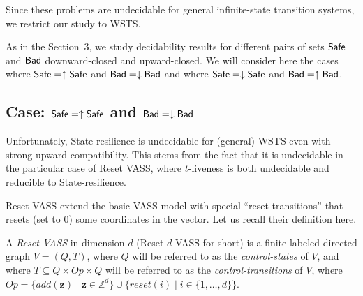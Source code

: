 


Since these problems are undecidable for general infinite-state transition systems, we restrict our study to WSTS.

As in the Section~3, we study decidability results for different pairs of sets $\textsf{Safe}$ and $\textsf{Bad}$ downward-closed and upward-closed. We will consider here the cases where 
$\textsf{Safe} = \uparrow \textsf{Safe}$ and $\textsf{Bad} = \downarrow \textsf{Bad}$ 
and where 
$\textsf{Safe} = \downarrow \textsf{Safe}$ and $\textsf{Bad} = \uparrow \textsf{Bad}$.


\subsection{Case: $\textsf{Safe} = \uparrow \textsf{Safe}$ and $\textsf{Bad} = \downarrow \textsf{Bad}$}



Unfortunately, {\sc State-resilience} is undecidable for (general) WSTS even with strong upward-compatibility.
This stems from the fact that it is undecidable in the particular case of Reset VASS,
where  $t$-liveness is both undecidable and 
 reducible to {\sc State-resilience}.


Reset VASS extend the basic VASS model with special “reset
transitions” that resets (set to $0$) some coordinates in the vector. Let us recall their definition here.\\




\begin{definition}
A {\em Reset VASS} in dimension $d$ (Reset $d$-VASS for short) is a finite 
labeled directed graph $V = (Q,T)$, where $Q$ will be referred to as the {\em control-states} of $V$, and where 
$T \subseteq Q \times Op \times Q$
 will be referred to as the {\em control-transitions} of $V$,
where $Op = \{ add(\textbf{z}) \mid \textbf{z} \in \mathds{Z}^d\} \cup 
		\{ reset(i) \mid i \in \{1,\ldots,d\} \}$.
\end{definition}

